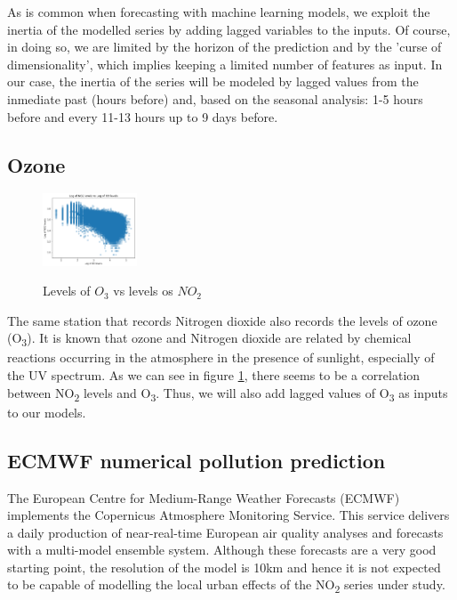\documentclass[a4paper,twocolumn,5p]{elsarticle}
\begin{document}
As is common when forecasting with machine learning models, we exploit
the inertia of the modelled series by adding lagged variables to the
inputs. Of course, in doing so, we are limited by the horizon of the
prediction and by the 'curse of dimensionality', which implies keeping
a limited number of features as input. In our case, the inertia of the
series will be modeled by lagged values from the inmediate past (hours
before) and, based on the seasonal analysis: 1-5 hours before and
every 11-13 hours up to 9 days before.

\subsection{Ozone}

\begin{figure}
  \centering
  \includegraphics[width=0.25\textwidth]{no2vso3}
  \label{figure:no2vso3}
  \caption{Levels of $O_3$ vs levels os $NO_2$}
\end{figure}

The same station that records Nitrogen dioxide also records the levels
of ozone (O\textsubscript{3}). It is known that ozone and Nitrogen
dioxide are related by chemical reactions occurring in the atmosphere
in the presence of sunlight, especially of the UV spectrum.  As we can
see in figure \ref{figure:no2vso3}, there seems to be a correlation
between NO\textsubscript{2} levels and O\textsubscript{3}. Thus, we
will also add lagged values of O\textsubscript{3} as inputs to our
models.

\subsection{ECMWF numerical pollution prediction}
\label{sec:ecmwf-numer-poll}

The European Centre for Medium-Range Weather Forecasts (ECMWF)
implements the Copernicus Atmosphere Monitoring Service.  This service
delivers a daily production of near-real-time European air quality
analyses and forecasts with a multi-model ensemble system. Although
these forecasts are a very good starting point, 
the resolution of the model is 10km
and hence it is not expected to be capable of modelling the local
urban effects of the NO\textsubscript{2} series under study.
\end{document}
